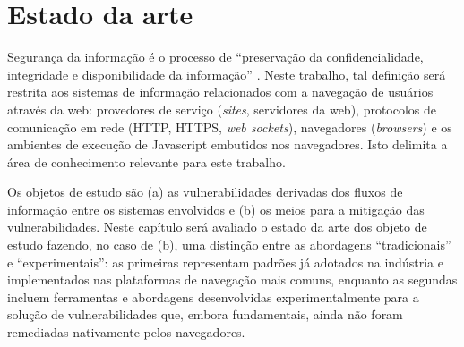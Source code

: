 

\section{Estado da arte}

Segurança da informação é o processo de ``preservação da confidencialidade, integridade e disponibilidade da informação'' \cite{ISO2016}. Neste trabalho, tal definição será restrita aos sistemas de informação relacionados com a navegação de usuários através da web: provedores de serviço (\textit{sites}, servidores da web), protocolos de comunicação em rede (HTTP, HTTPS, \textit{web sockets}), navegadores (\textit{browsers}) e os ambientes de execução de Javascript embutidos nos navegadores. Isto delimita a área de conhecimento relevante para este trabalho.

Os objetos de estudo são (a) as vulnerabilidades derivadas dos fluxos de informação \cite{Goguen1982} \cite{Denning1976} entre os sistemas envolvidos e (b) os meios para a mitigação das vulnerabilidades. Neste capítulo será avaliado o estado da arte dos objeto de estudo fazendo, no caso de (b), uma distinção entre as abordagens ``tradicionais'' e ``experimentais'': as primeiras representam padrões já adotados na indústria e implementados nas plataformas de navegação mais comuns, enquanto as segundas incluem ferramentas e abordagens desenvolvidas experimentalmente para a solução de vulnerabilidades que, embora fundamentais, ainda não foram remediadas nativamente pelos navegadores.


